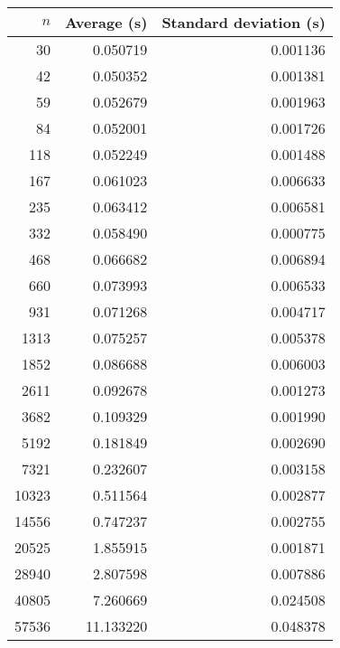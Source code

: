 \begin{tabular}{rrr}
$n$ & Average (s) & Standard deviation (s)\\\hline
30 & 0.050719 & 0.001136\\
42 & 0.050352 & 0.001381\\
59 & 0.052679 & 0.001963\\
84 & 0.052001 & 0.001726\\
118 & 0.052249 & 0.001488\\
167 & 0.061023 & 0.006633\\
235 & 0.063412 & 0.006581\\
332 & 0.058490 & 0.000775\\
468 & 0.066682 & 0.006894\\
660 & 0.073993 & 0.006533\\
931 & 0.071268 & 0.004717\\
1313 & 0.075257 & 0.005378\\
1852 & 0.086688 & 0.006003\\
2611 & 0.092678 & 0.001273\\
3682 & 0.109329 & 0.001990\\
5192 & 0.181849 & 0.002690\\
7321 & 0.232607 & 0.003158\\
10323 & 0.511564 & 0.002877\\
14556 & 0.747237 & 0.002755\\
20525 & 1.855915 & 0.001871\\
28940 & 2.807598 & 0.007886\\
40805 & 7.260669 & 0.024508\\
57536 & 11.133220 & 0.048378\\
\end{tabular}
